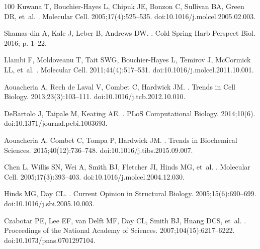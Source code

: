 \documentclass[10pt,letterpaper]{article}
\begin{document}
\begin{thebibliography}{100}
Kuwana T, Bouchier-Hayes L, Chipuk JE, Bonzon C, Sullivan BA, Green DR, et~al.
.
\newblock Molecular Cell. 2005;17(4):525--535.
\newblock doi:{10.1016/j.molcel.2005.02.003}.

Shamas-din A, Kale J, Leber B, Andrews DW.
.
\newblock Cold Spring Harb Perspect Biol. 2016; p. 1--22.

Llambi F, Moldoveanu T, Tait SWG, Bouchier-Hayes L, Temirov J, McCormick LL,
  et~al.
.
\newblock Molecular Cell. 2011;44(4):517--531.
\newblock doi:{10.1016/j.molcel.2011.10.001}.

Aouacheria A, {Rech de Laval} V, Combet C, Hardwick JM.
.
\newblock Trends in Cell Biology. 2013;23(3):103--111.
\newblock doi:{10.1016/j.tcb.2012.10.010}.

DeBartolo J, Taipale M, Keating AE.
.
\newblock PLoS Computational Biology. 2014;10(6).
\newblock doi:{10.1371/journal.pcbi.1003693}.

Aouacheria A, Combet C, Tompa P, Hardwick JM.
.
\newblock Trends in Biochemical Sciences. 2015;40(12):736--748.
\newblock doi:{10.1016/j.tibs.2015.09.007}.

Chen L, Willis SN, Wei A, Smith BJ, Fletcher JI, Hinds MG, et~al.
.
\newblock Molecular Cell. 2005;17(3):393--403.
\newblock doi:{10.1016/j.molcel.2004.12.030}.

Hinds MG, Day CL.
.
\newblock Current Opinion in Structural Biology. 2005;15(6):690--699.
\newblock doi:{10.1016/j.sbi.2005.10.003}.

Czabotar PE, Lee EF, van Delft MF, Day CL, Smith BJ, Huang DCS, et~al.
.
\newblock Proceedings of the National Academy of Sciences.
  2007;104(15):6217--6222.
\newblock doi:{10.1073/pnas.0701297104}.


\end{thebibliography}
\end{document}
